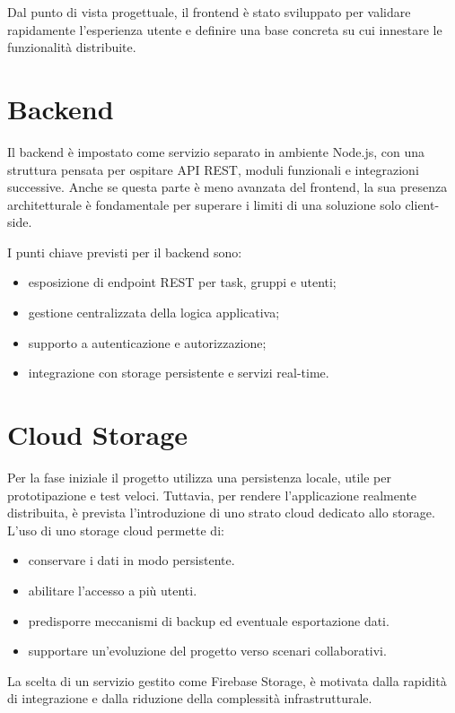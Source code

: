 \documentclass[12pt,a4paper]{article}
\begin{document}
Dal punto di vista progettuale, il frontend \`e stato sviluppato per validare rapidamente l'esperienza utente e definire una base concreta su cui innestare le funzionalit\`a distribuite.

\section{Backend}

Il backend \`e impostato come servizio separato in ambiente Node.js, con una struttura pensata per ospitare API REST, moduli funzionali e integrazioni successive. Anche se questa parte \`e meno avanzata del frontend, la sua presenza architetturale \`e fondamentale per superare i limiti di una soluzione solo client-side.

I punti chiave previsti per il backend sono:
\begin{itemize}
    \item esposizione di endpoint REST per task, gruppi e utenti;
    \item gestione centralizzata della logica applicativa;
    \item supporto a autenticazione e autorizzazione;
    \item integrazione con storage persistente e servizi real-time.
\end{itemize}

\section{Cloud Storage}
Per la fase iniziale il progetto utilizza una persistenza locale, utile per prototipazione e test veloci. Tuttavia, per rendere l'applicazione realmente distribuita, \`e prevista l'introduzione di uno strato cloud dedicato allo storage.
L'uso di uno storage cloud permette di:
\begin{itemize}
    \item conservare i dati in modo persistente.
    \item abilitare l'accesso a più utenti.
    \item predisporre meccanismi di backup ed eventuale esportazione dati.
    \item supportare un'evoluzione del progetto verso scenari collaborativi.
\end{itemize}

La scelta di un servizio gestito come Firebase Storage, \`e motivata dalla rapidit\`a di integrazione e dalla riduzione della complessit\`a infrastrutturale.
\end{document}
